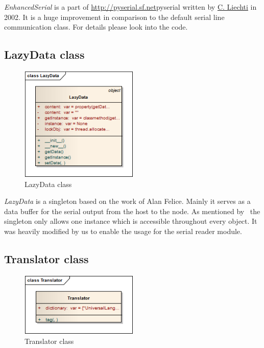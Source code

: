 \textit{EnhancedSerial} is a part of \url{http://pyserial.sf.net}{pyserial}  written by \href{mailto:cliechti@gmx.net}{C. Liechti} in 2002.
It is a huge improvement in comparison to the default serial line communication class. For details please look into the code.


\newpage
\subsection{LazyData class}
\begin{figure}[H]
   \centering
   \includegraphics[width=0.5\textwidth]{pic/LazyData.png}%
   \caption{LazyData class}
   \label{LazyDatapic}%
\end{figure}

\textit{LazyData} is a singleton based on the work of Alan Felice. Mainly it serves as a data buffer for the serial output from the host to the node. 
As mentioned by~\cite{GammaHelmJohnsonVlissides199711} the singleton only allows one instance which is accessible throughout every object. It was
heavily modified by us to enable the usage for the serial reader module.

\newpage
\subsection{Translator class}
\begin{figure}[H]
   \centering
   \includegraphics[width=0.5\textwidth]{pic/Translator.png}%
   \caption{Translator class}
   \label{Translatorpic}%
\end{figure}

